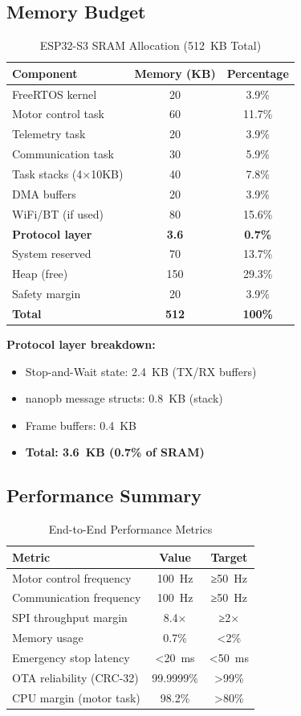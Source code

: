 \subsection{Memory Budget}

\begin{table}[H]
\centering
\caption{ESP32-S3 SRAM Allocation (512~KB Total)}
\begin{tabular}{lcc}
\toprule
\textbf{Component} & \textbf{Memory (KB)} & \textbf{Percentage} \\
\midrule
FreeRTOS kernel & 20 & 3.9\% \\
Motor control task & 60 & 11.7\% \\
Telemetry task & 20 & 3.9\% \\
Communication task & 30 & 5.9\% \\
Task stacks (4×10KB) & 40 & 7.8\% \\
DMA buffers & 20 & 3.9\% \\
WiFi/BT (if used) & 80 & 15.6\% \\
\textbf{Protocol layer} & \textbf{3.6} & \textbf{0.7\%} \\
System reserved & 70 & 13.7\% \\
Heap (free) & 150 & 29.3\% \\
Safety margin & 20 & 3.9\% \\
\midrule
\textbf{Total} & \textbf{512} & \textbf{100\%} \\
\bottomrule
\end{tabular}
\end{table}

\textbf{Protocol layer breakdown:}
\begin{itemize}
    \item Stop-and-Wait state: 2.4~KB (TX/RX buffers)
    \item nanopb message structs: 0.8~KB (stack)
    \item Frame buffers: 0.4~KB
    \item \textbf{Total: 3.6~KB (0.7\% of SRAM)}
\end{itemize}

\subsection{Performance Summary}

\begin{table}[H]
\centering
\caption{End-to-End Performance Metrics}
\begin{tabular}{lcc}
\toprule
\textbf{Metric} & \textbf{Value} & \textbf{Target} \\
\midrule
Motor control frequency & 100~Hz & ≥50~Hz \\
Communication frequency & 100~Hz & ≥50~Hz \\
SPI throughput margin & 8.4× & ≥2× \\
Memory usage & 0.7\% & <2\% \\
Emergency stop latency & <20~ms & <50~ms \\
OTA reliability (CRC-32) & 99.9999\% & >99\% \\
CPU margin (motor task) & 98.2\% & >80\% \\
\bottomrule
\end{tabular}
\end{table}

